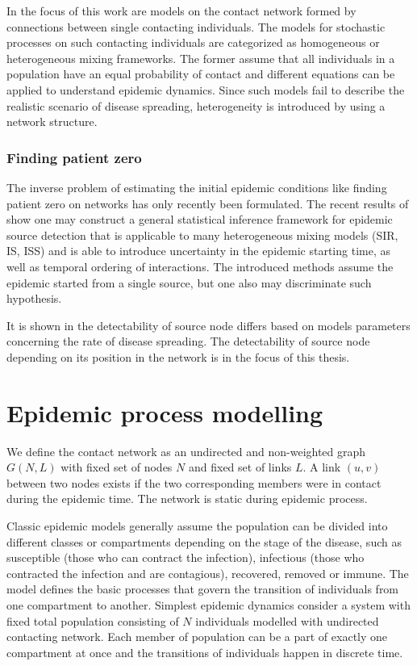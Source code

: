 \documentclass[times, utf8, diplomski]{fer}
\begin{document}
In the focus of this work are models on the contact network formed by connections between single contacting individuals. The models for stochastic processes on such contacting individuals are categorized as homogeneous or heterogeneous mixing frameworks. The former assume that all individuals in a population have an equal probability of contact and different equations can be applied to understand epidemic dynamics.  
Since such models fail to describe the realistic scenario of disease spreading,  heterogeneity is introduced by using a network structure. 

\subsection{Finding patient zero}  
The inverse problem of estimating the initial epidemic conditions like finding patient zero on networks has only recently been formulated. The recent results of \cite{Nino} show one may construct a general statistical inference framework for epidemic source detection that is applicable to many heterogeneous mixing models (SIR, IS, ISS) and is able to introduce uncertainty in the epidemic starting time, as well as temporal ordering of interactions. The introduced methods assume the epidemic started from a single source, but one also may discriminate such hypothesis.

It is shown in \cite{Nino} the detectability of source node differs based on models parameters concerning the rate of disease spreading. The detectability of source node depending on its position in the network is in the focus of this thesis.

\chapter{Epidemic process modelling}
We define the contact network as an undirected and non-weighted graph $G(N, L)$ with fixed set of nodes $N$ and fixed set of links $L$. A link $(u, v)$ between two nodes exists if the two corresponding members were in contact during the epidemic time. The network is static during epidemic process. 


 Classic epidemic models generally  assume the population can be divided into different classes or compartments depending on the stage of the disease, such as susceptible (those who can contract the infection), infectious (those who contracted the infection and are contagious), recovered,  removed or immune. The model defines the basic processes that govern the transition of individuals from one compartment to another.
Simplest epidemic dynamics consider a system with fixed total population consisting of $N$ individuals modelled with undirected contacting network. Each member of population can be a part of exactly one compartment at once and the transitions of individuals happen in discrete time.
\end{document}
